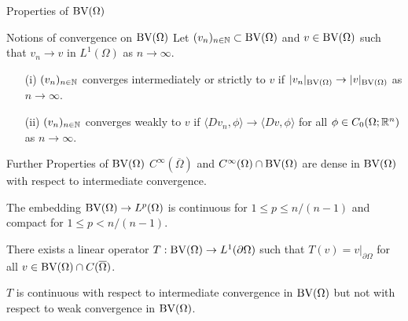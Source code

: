 \begin{frame}{Properties of $\textup{BV}(\Omega)$}
\end{frame}

\begin{frame}{Notions of convergence on $\textup{BV}(\Omega)$}
  Let $(v_n)_{n\in\mathbb{N}}\subset \textup{BV}(\Omega)$ and $v\in \textup{BV}(\Omega)$ such that
  $v_n\rightarrow v$ in $L^1(\Omega)$ as $n\rightarrow\infty$.
  \pause
  \begin{itemize}
    \item[(i)]
      $(v_n)_{n\in\mathbb{N}}$ converges intermediately or strictly to $v$
      if $|v_n|_{\textup{BV}(\Omega)}\rightarrow |v|_{\textup{BV}(\Omega)}$ as
      $n\rightarrow\infty$.
      \pause
    \item[(ii)] $(v_n)_{n\in\mathbb{N}}$ converges weakly to
      $v$ if
      $\langle Dv_n,\phi\rangle\rightarrow \langle Dv,\phi\rangle$ 
      for all $\phi\in C_0(\Omega;\mathbb{R}^n)$ as 
      $n\rightarrow\infty$.
  \end{itemize}
\end{frame}

\begin{frame}{Further Properties of $\textup{BV}(\Omega)$}
  $C^\infty(\overline\Omega)$ and $C^\infty(\Omega)\cap\textup{BV}(\Omega)$ are dense
  in $\textup{BV}(\Omega)$ with respect to intermediate convergence.
  
  \pause
  \bigskip

  The embedding $\textup{BV}(\Omega)\to L^p(\Omega)$ is continuous for
  $1\leq p\leq n/(n-1)$ and compact for $1\leq p< n/(n-1)$.
  
  \pause
  \bigskip

  There exists a linear operator $T:\textup{BV}(\Omega)\to L^1(\partial\Omega)$
  such that $T(v) = v|_{\partial\Omega}$ for all $v\in\textup{BV}(\Omega)\cap
  C(\overline\Omega)$.

  $T$ is continuous with respect to intermediate convergence in $\textup{BV}(\Omega)$
  but not with respect to weak convergence in $\textup{BV}(\Omega)$. 
\end{frame}

